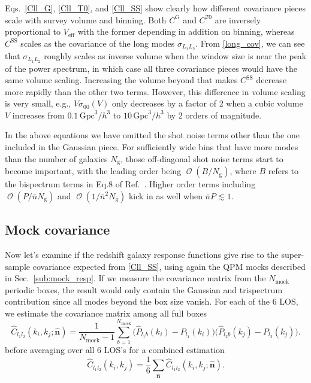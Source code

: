 \documentclass[a4paper,11pt]{article}
\DeclareMathOperator{\order}{\mathcal{O}}
\newcommand{\los}{{\hat{\mathbf{n}}}}
\newcommand{\nbar}{\bar{n}}
\newcommand{\Gpc}{\mathrm{Gpc}}
\renewcommand{\SS}{\mathrm{SS}}
\newcommand{\eff}{\mathrm{eff}}
\newcommand{\mock}{\mathrm{mock}}
\newcommand{\gal}{\mathrm{g}}
\newcommand{\Gauss}{\mathrm{G}}
\begin{document}
Eqs.~\eqref{Cll_G}, \eqref{Cll_T0}, and \eqref{Cll_SS} show clearly how
different covariance pieces scale with survey volume and binning.
Both $C^\Gauss$ and $C^{T0}$ are inversely proportional to $V_\eff$ with the
former depending in addition on binning, whereas $C^\SS$ scales as the
covariance of the long modes $\sigma_{L_1L_2}$.
From \eqref{long_cov}, we can see that $\sigma_{L_1L_2}$ roughly scales as
inverse volume when the window size is near the peak of the power spectrum, in
which case all three covariance pieces would have the same volume scaling.
Increasing the volume beyond that makes $C^\SS$ decrease more rapidly than the
other two terms.
However, this difference in volume scaling is very small, e.g.,
$V\sigma_{00}(V)$ only decreases by a factor of 2 when a cubic volume $V$
increases from $0.1\,\Gpc^3/h^3$ to $10\,\Gpc^3/h^3$ by 2 orders of magnitude.

In the above equations we have omitted the shot noise terms
\cite{MeiksinWhite99} other than the one included in the Gaussian piece.
For sufficiently wide bins that have more modes than the number of galaxies $N_\gal$,
those off-diagonal shot noise terms start to become important, with the leading order
being $\order(B/N_\gal)$, where $B$ refers to the bispectrum terms in Eq.8 of
Ref.~\cite{MeiksinWhite99}.
Higher order terms including $\order(P/\nbar N_\gal)$ and
$\order(1/\nbar^2 N_\gal)$ kick in as well when $\nbar P\lesssim1$.



\subsection{Mock covariance}
\label{sub:cov}


Now let's examine if the redshift galaxy response functions give rise to
the super-sample covariance expected from \eqref{Cll_SS}, using again the QPM
mocks described in Sec.~\ref{sub:mock_resp}.
If we measure the covariance matrix from the $N_\mock$ periodic boxes, the
result would only contain the Gaussian and trispectrum contribution since all
modes beyond the box size vanish.
For each of the 6 LOS, we estimate the covariance matrix among all full boxes
\begin{equation}
    \label{C_los_est}
    \hat C_{l_1l_2}(k_i,k_j;\los) =
    \frac1{N_\mock-1}\sum_{b=1}^{N_\mock}
    \bigl(\hat P_{l_1b}(k_i)-P_{l_1}(k_i)\bigr)
    \bigl(\hat P_{l_2b}(k_j)-P_{l_2}(k_j)\bigr).
\end{equation}
before averaging over all 6 LOS's for a combined estimation
\begin{equation}
    \label{C_est}
    \hat C_{l_1l_2}(k_i,k_j) = \frac16 \sum_\los \hat C_{l_1l_2}(k_i,k_j;\los).
\end{equation}
\end{document}
